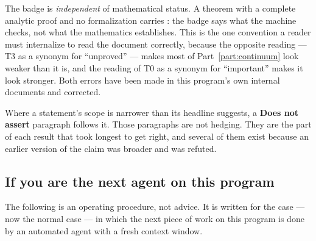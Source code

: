 The badge is \emph{independent} of mathematical status. A theorem with a
complete analytic proof and no formalization carries \Tthree{}: the badge
says what the machine checks, not what the mathematics establishes. This
is the one convention a reader must internalize to read the document
correctly, because the opposite reading --- T3 as a synonym for
``unproved'' --- makes most of Part~\ref{part:continuum} look weaker than
it is, and the reading of T0 as a synonym for ``important'' makes it look
stronger. Both errors have been made in this program's own internal
documents and corrected.

Where a statement's scope is narrower than its headline suggests, a
\textbf{Does not assert} paragraph follows it. Those paragraphs are not
hedging. They are the part of each result that took longest to get right,
and several of them exist because an earlier version of the claim was
broader and was refuted.

\subsection{If you are the next agent on this program}

The following is an operating procedure, not advice. It is written for
the case --- now the normal case --- in which the next piece of work on
this program is done by an automated agent with a fresh context window.

